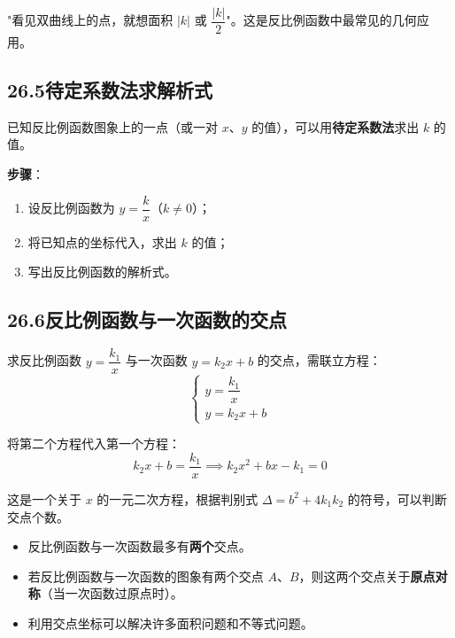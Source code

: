 \documentclass[12pt, a4paper]{ctexart}
\begin{document}
\begin{tipbox}[规律总结]
"看见双曲线上的点，就想面积 $|k|$ 或 $\dfrac{|k|}{2}$"。这是反比例函数中最常见的几何应用。
\end{tipbox}

\subsection*{26.5\quad 待定系数法求解析式}

\begin{knowledgebox}[5. 待定系数法]
已知反比例函数图象上的一点（或一对 $x$、$y$ 的值），可以用\textbf{待定系数法}求出 $k$ 的值。

\medskip
\textbf{步骤}：
\begin{enumerate}[leftmargin=2em]
  \item 设反比例函数为 $y = \dfrac{k}{x}$（$k \neq 0$）；
  \item 将已知点的坐标代入，求出 $k$ 的值；
  \item 写出反比例函数的解析式。
\end{enumerate}
\end{knowledgebox}

\subsection*{26.6\quad 反比例函数与一次函数的交点}

\begin{knowledgebox}[6. 反比例函数与一次函数的交点问题]
求反比例函数 $y = \dfrac{k_1}{x}$ 与一次函数 $y = k_2 x + b$ 的交点，需联立方程：
\[
  \begin{cases}
    y = \dfrac{k_1}{x} \\[6pt]
    y = k_2 x + b
  \end{cases}
\]

将第二个方程代入第一个方程：
\[
  k_2 x + b = \frac{k_1}{x} \implies k_2 x^2 + bx - k_1 = 0
\]

这是一个关于 $x$ 的一元二次方程，根据判别式 $\Delta = b^2 + 4k_1 k_2$ 的符号，可以判断交点个数。
\end{knowledgebox}

\begin{tipbox}[规律总结]
\begin{itemize}[leftmargin=2em]
  \item 反比例函数与一次函数最多有\textbf{两个}交点。
  \item 若反比例函数与一次函数的图象有两个交点 $A$、$B$，则这两个交点关于\textbf{原点对称}（当一次函数过原点时）。
  \item 利用交点坐标可以解决许多面积问题和不等式问题。
\end{itemize}
\end{tipbox}
\end{document}
